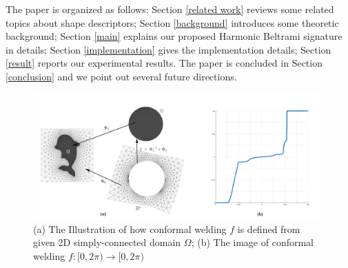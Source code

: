 \documentclass[review,onefignum,onetabnum]{siamonline190516}
\begin{document}
    
    The paper is organized as follows: Section \ref{related work} reviews some related topics about shape descriptors; Section \ref{background} introduces some theoretic background; Section \ref{main} explains our proposed Harmonic Beltrami signature in details; Section \ref{implementation} gives the implementation details; Section \ref{result} reports our experimental results. The paper is concluded in Section \ref{conclusion} and we point out several future directions.

    \begin{figure}
        \begin{center}
        \includegraphics[width=11cm]{fig1.png}
        \caption{(a) The Illustration of how conformal welding $f$ is defined from given 2D simply-connected domain $\Omega$; (b) The image of conformal welding $f: [0, 2\pi) \rightarrow [0, 2\pi)$}
        \end{center}
        \label{fig1}
    \end{figure}
\end{document}
